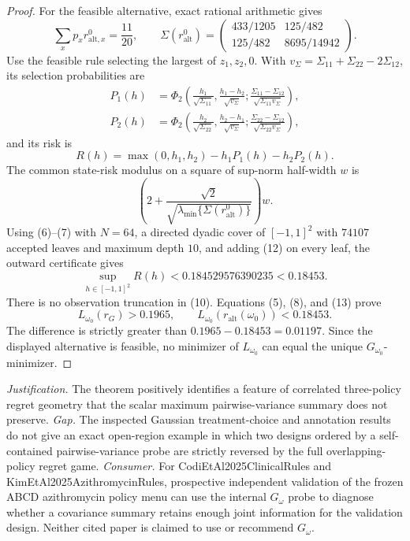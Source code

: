 \documentclass{article}
\begin{document}
\begin{proof}
For the feasible alternative, exact rational arithmetic gives
\[
 \sum_xp_xr^0_{\mathrm{alt},x}=\frac{11}{20},\qquad
 \Sigma(r^0_{\mathrm{alt}})=
 \begin{pmatrix}433/1205&125/482\\125/482&8695/14942\end{pmatrix}. \tag{9}
\]
Use the feasible rule selecting the largest of \(z_1,z_2,0\).  With \(v_\Sigma=\Sigma_{11}+\Sigma_{22}-2\Sigma_{12}\), its selection probabilities are
\[
 \begin{aligned}
 P_1(h)&=\Phi_2\!\left(\frac{h_1}{\sqrt{\Sigma_{11}}},
 \frac{h_1-h_2}{\sqrt{v_\Sigma}};
 \frac{\Sigma_{11}-\Sigma_{12}}{\sqrt{\Sigma_{11}v_\Sigma}}\right),\\
 P_2(h)&=\Phi_2\!\left(\frac{h_2}{\sqrt{\Sigma_{22}}},
 \frac{h_2-h_1}{\sqrt{v_\Sigma}};
 \frac{\Sigma_{22}-\Sigma_{12}}{\sqrt{\Sigma_{22}v_\Sigma}}\right),
 \end{aligned}                                                       \tag{10}
\]
and its risk is
\[
 R(h)=\max(0,h_1,h_2)-h_1P_1(h)-h_2P_2(h).                           \tag{11}
\]
The common state-risk modulus on a square of sup-norm half-width \(w\) is
\[
 \left(2+\frac{\sqrt2}{\sqrt{\lambda_{\min}\{\Sigma(r^0_{\mathrm{alt}})\}}}\right)w. \tag{12}
\]
Using (6)--(7) with \(N=64\), a directed dyadic cover of \([-1,1]^2\) with \(74107\) accepted leaves and maximum depth \(10\), and adding (12) on every leaf, the outward certificate gives
\[
 \sup_{h\in[-1,1]^2}R(h)<0.184529576390235<0.18453.                 \tag{13}
\]
There is no observation truncation in (10).  Equations (5), (8), and (13) prove
\[
 L_{\omega_0}(r_G)>0.1965,\qquad
 L_{\omega_0}(r_{\mathrm{alt}}(\omega_0))<0.18453.
\]
The difference is strictly greater than \(0.1965-0.18453=0.01197\).  Since the displayed alternative is feasible, no minimizer of \(L_{\omega_0}\) can equal the unique \(G_{\omega_0}\)-minimizer.
\end{proof}
\par\smallskip\noindent \textit{Justification.} The theorem positively identifies a feature of correlated three-policy regret geometry that the scalar maximum pairwise-variance summary does not preserve. \textit{Gap.} The inspected Gaussian treatment-choice and annotation results do not give an exact open-region example in which two designs ordered by a self-contained pairwise-variance probe are strictly reversed by the full overlapping-policy regret game. \textit{Consumer.} For CodiEtAl2025ClinicalRules and KimEtAl2025AzithromycinRules, prospective independent validation of the frozen ABCD azithromycin policy menu can use the internal \(G_\omega\) probe to diagnose whether a covariance summary retains enough joint information for the validation design. Neither cited paper is claimed to use or recommend \(G_\omega\).
\end{document}
